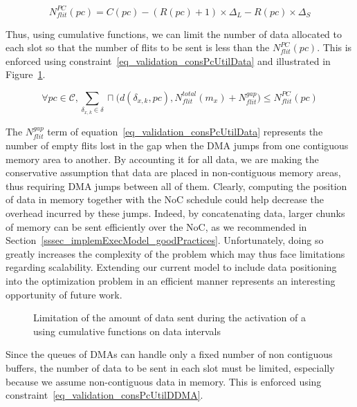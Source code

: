 \documentclass[main.tex]{subfiles}
\begin{document}
\begin{displaymath}
    N_{flit}^{PC} (pc) = C(pc) - (R(pc) + 1) \times \Delta_L - R(pc)\times \Delta_S 
\end{displaymath}

Thus, using cumulative functions, we can limit the number of data allocated to each \PC{} slot so that the number of flits to be sent is less than the $N_{flit}^{PC} (pc)$. This is enforced using constraint~\ref{eq_validation_consPcUtilData} and illustrated in Figure~\ref{fig_validation_consPcUtilData}. 

\begin{equation}
    \label{eq_validation_consPcUtilData}
    \forall pc \in \mathcal{C} , 
    \sum_{\delta_{x,k} \in \delta} \sqcap \Big( d(\delta_{x,k} , pc) , N_{flit}^{total}(m_x) + N_{flit}^{gap} \Big) \leq N_{flit}^{PC} (pc)
\end{equation}

The $N_{flit}^{gap}$ term of equation~\ref{eq_validation_consPcUtilData} represents the number of empty flits lost in the gap when the DMA jumps from one contiguous memory area to another. By accounting it for all data, we are making the conservative assumption that data are placed in non-contiguous memory areas, thus requiring DMA jumps between all of them. Clearly, computing the position of data in memory together with the NoC schedule could help decrease the overhead incurred by these jumps. Indeed, by concatenating data, larger chunks of memory can be sent efficiently over the NoC, as we recommended in Section~\ref{sssec_implemExecModel_goodPractices}.
Unfortunately, doing so greatly increases the complexity of the problem which may thus face limitations regarding scalability. Extending our current model to include data positioning into the optimization problem in an efficient manner represents an interesting opportunity of future work.

\begin{figure}
    \centering
    \scalebox{0.9}{}
    \caption{Limitation of the amount of data sent during the activation of a \PC{} using cumulative functions on data intervals}
    \label{fig_validation_consPcUtilData}
\end{figure}

Since the queues of DMAs can handle only a fixed number of non contiguous buffers, the number of data to be sent in each \PC{} slot must be limited, especially because we assume non-contiguous data in memory. This is enforced using constraint~\ref{eq_validation_consPcUtilDDMA}.
\end{document}
